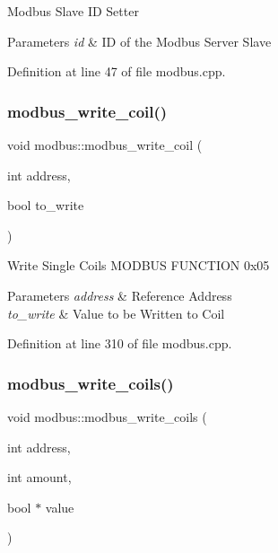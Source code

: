 Modbus Slave ID Setter 
\begin{DoxyParams}{Parameters}
{\em id} & ID of the Modbus Server Slave \\
\hline
\end{DoxyParams}


Definition at line 47 of file modbus.\+cpp.

\mbox{\label{classmodbus_a8717e5472d5a536beb0308bdeeac2233}} 
\subsubsection{\texorpdfstring{modbus\+\_\+write\+\_\+coil()}{modbus\_write\_coil()}}
{\footnotesize\ttfamily void modbus\+::modbus\+\_\+write\+\_\+coil (\begin{DoxyParamCaption}\item[{int}]{address,  }\item[{bool}]{to\+\_\+write }\end{DoxyParamCaption})}

Write Single Coils M\+O\+D\+B\+US F\+U\+N\+C\+T\+I\+ON 0x05 
\begin{DoxyParams}{Parameters}
{\em address} & Reference Address \\
\hline
{\em to\+\_\+write} & Value to be Written to Coil \\
\hline
\end{DoxyParams}


Definition at line 310 of file modbus.\+cpp.

\mbox{\label{classmodbus_a26201b5f872bce56f665d905ffcaaa97}} 
\subsubsection{\texorpdfstring{modbus\+\_\+write\+\_\+coils()}{modbus\_write\_coils()}}
{\footnotesize\ttfamily void modbus\+::modbus\+\_\+write\+\_\+coils (\begin{DoxyParamCaption}\item[{int}]{address,  }\item[{int}]{amount,  }\item[{bool $\ast$}]{value }\end{DoxyParamCaption})}

